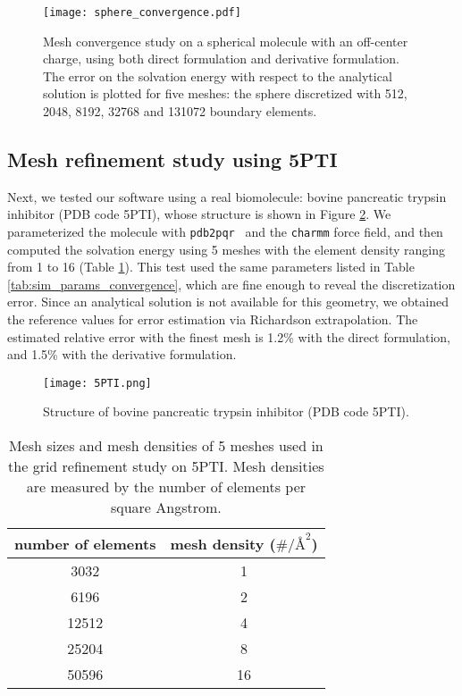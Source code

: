 \begin{figure}%
    \centering
    \texttt{[image: sphere\_convergence.pdf]} 
    \caption{Mesh convergence study on a spherical molecule with an off-center charge, using both direct formulation and derivative formulation. The error on the solvation energy  with respect to the analytical solution is plotted for five meshes:
    the sphere discretized with 512, 2048, 8192, 32768 and 131072 boundary elements.}
    \label{fig:sphere_convergence}
\end{figure}

\subsection{Mesh refinement study using 5PTI} \label{result_convergence_5PTI}

Next, we tested our software using a real biomolecule: bovine pancreatic trypsin inhibitor (PDB code 5PTI), whose structure \cite{wlodawer1984structure} is shown in Figure \ref{fig:5PTI_structure}.
We parameterized the molecule with \texttt{pdb2pqr}~\cite{DolinskyETal2004} and the \texttt{charmm} force field, and then computed the solvation energy using 5 meshes with the element density ranging from 1 to 16 (Table \ref{tab:5PTI_mesh}).
This test used the same parameters listed in Table \ref{tab:sim_params_convergence}, which are fine enough to reveal the discretization error.
Since an analytical solution is not available for this geometry, we obtained the reference values for error estimation via Richardson extrapolation.
The estimated relative error with the finest mesh is 1.2\% with the direct formulation, and 1.5\% with the derivative formulation.

\begin{figure}%
    \centering
    \texttt{[image: 5PTI.png]}
    \caption{Structure of bovine pancreatic trypsin inhibitor (PDB code 5PTI).}
    \label{fig:5PTI_structure}
\end{figure}

\begin{table}[]
    \centering
    \begin{tabular}{cc}
    number of elements & mesh density ($\#/{\si{\angstrom}}^2$) \\
    \hline
    3032               & 1                                       \\
    6196               & 2                                       \\
    12512              & 4                                       \\
    25204              & 8                                       \\
    50596              & 16                                     
    \end{tabular}
    \caption{Mesh sizes and mesh densities of 5 meshes used in the grid refinement study on 5PTI. Mesh densities are measured by the number of elements per square Angstrom.}
    \label{tab:5PTI_mesh}
\end{table}

